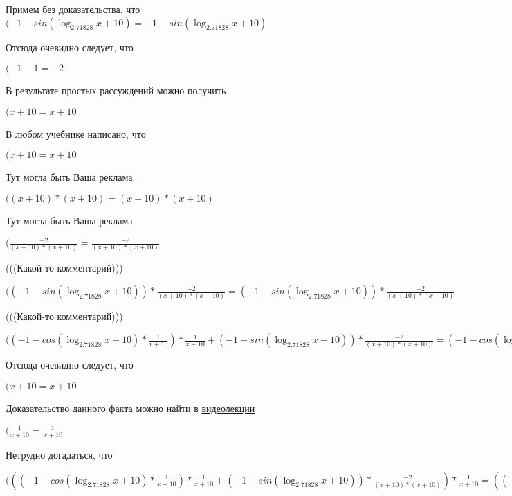 \documentclass[12pt,a4paper,fleqn]{article}
\theoremstyle{definition}
\begin{document}
Примем без доказательства, что
$( -1  - sin(\log_{ 2.71828 }{ x  +  10 }) =  -1  - sin(\log_{ 2.71828 }{ x  +  10 })$

Отсюда очевидно следует, что

$( -1  -  1  =  -2 $

В результате простых рассуждений можно получить

$( x  +  10  =  x  +  10 $

В любом учебнике написано, что

$( x  +  10  =  x  +  10 $

Тут могла быть Ваша реклама.

$(( x  +  10 ) * ( x  +  10 ) = ( x  +  10 ) * ( x  +  10 )$

Тут могла быть Ваша реклама.

$(\frac{ -2 }{( x  +  10 ) * ( x  +  10 )}
 = \frac{ -2 }{( x  +  10 ) * ( x  +  10 )}
$

(((Какой-то комментарий)))

$(( -1  - sin(\log_{ 2.71828 }{ x  +  10 })) * \frac{ -2 }{( x  +  10 ) * ( x  +  10 )}
 = ( -1  - sin(\log_{ 2.71828 }{ x  +  10 })) * \frac{ -2 }{( x  +  10 ) * ( x  +  10 )}
$

(((Какой-то комментарий)))

$(( -1  - cos(\log_{ 2.71828 }{ x  +  10 }) * \frac{ 1 }{ x  +  10 }
) * \frac{ 1 }{ x  +  10 }
 + ( -1  - sin(\log_{ 2.71828 }{ x  +  10 })) * \frac{ -2 }{( x  +  10 ) * ( x  +  10 )}
 = ( -1  - cos(\log_{ 2.71828 }{ x  +  10 }) * \frac{ 1 }{ x  +  10 }
) * \frac{ 1 }{ x  +  10 }
 + ( -1  - sin(\log_{ 2.71828 }{ x  +  10 })) * \frac{ -2 }{( x  +  10 ) * ( x  +  10 )}
$

Отсюда очевидно следует, что

$( x  +  10  =  x  +  10 $

Доказательство данного факта можно найти в \href{https://www.youtube.com/watch?v=dQw4w9WgXcQ}{видеолекции}

$(\frac{ 1 }{ x  +  10 }
 = \frac{ 1 }{ x  +  10 }
$

Нетрудно догадаться, что

$((( -1  - cos(\log_{ 2.71828 }{ x  +  10 }) * \frac{ 1 }{ x  +  10 }
) * \frac{ 1 }{ x  +  10 }
 + ( -1  - sin(\log_{ 2.71828 }{ x  +  10 })) * \frac{ -2 }{( x  +  10 ) * ( x  +  10 )}
) * \frac{ 1 }{ x  +  10 }
 = (( -1  - cos(\log_{ 2.71828 }{ x  +  10 }) * \frac{ 1 }{ x  +  10 }
) * \frac{ 1 }{ x  +  10 }
 + ( -1  - sin(\log_{ 2.71828 }{ x  +  10 })) * \frac{ -2 }{( x  +  10 ) * ( x  +  10 )}
) * \frac{ 1 }{ x  +  10 }
$
\end{document}
